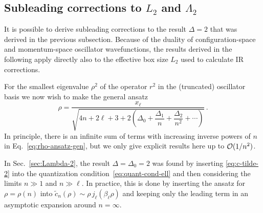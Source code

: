   \subsection{Subleading corrections to $L_2$ and $\Lambda_2$}
  \label{subsec:appendix_subleading}

  It is possible to derive subleading corrections to the result $\Delta=2$ that
  was derived in the previous subsection.  Because of the duality of
  configuration-space and momentum-space oscillator wavefunctions, the results
  derived in the following apply directly also to the effective box size $L_2$
  used to calculate IR corrections.

  For the smallest eigenvalue $\rho^2$ of the operator $r^2$ in the (truncated)
  oscillator basis we now wish to make the general ansatz
  \begin{equation}
   \rho = \frac{x_\ell}{\sqrt{4n+2\ell+3+2
   \left(\Delta_0+\dfrac{\Delta_1}{n}+\dfrac{\Delta_2}{n^2}+\cdots\right)}} \,.
  \label{eq:rho-ansatz-gen}
  \end{equation}
  In principle, there is an infinite sum of terms with increasing inverse
  powers
  of $n$ in Eq.~\eqref{eq:rho-ansatz-gen}, but we only give explicit results
  here up to $\mathcal{O}(1/n^2)$.

  In Sec.~\ref{sec:Lambda-2}, the result $\Delta=\Delta_0=2$ was found by
  inserting \eqref{eq:c-tilde-2} into the quantization
  condition~\eqref{eq:quant-cond-ell} and then considering the limits $n\gg1$
  and $n\gg\ell$.  In practice, this is done by inserting the ansatz for
  $\rho=\rho(n)$ into $\tilde{c}_n(\rho)\sim \rho\,j_\ell(\beta_\ell\rho)$ and
  keeping only the leading term in an asymptotic expansion around $n=\infty$.

